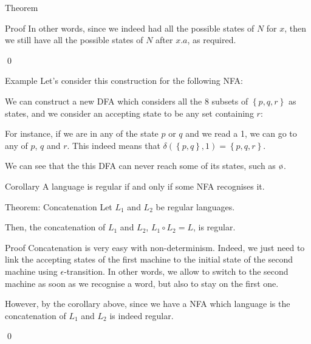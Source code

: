 \documentclass[a4paper]{article}
\begin{document}
\begin{parag}{Theorem}
\begin{subparag}{Proof}
        In other words, since we indeed had all the possible states of $N$ for $x$, then we still have all the possible states of $N$ after $x.a$, as required.

        \qed
    \end{subparag}
  
    \begin{subparag}{Example}
        Let's consider this construction for the following NFA:

        We can construct a new DFA which considers all the $8$ subsets of $\left\{p, q, r\right\}$ as states, and we consider an accepting state to be any set containing $r$:

        For instance, if we are in any of the state $p$ or $q$ and we read a 1, we can go to any of $p$, $q$ and $r$. This indeed means that $\delta\left(\left\{p, q\right\}, 1\right) = \left\{p, q, r\right\}$.

        We can see that the this DFA can never reach some of its states, such as $\o$.
    \end{subparag}
\end{parag}

\begin{parag}{Corollary}
    A language is regular if and only if some NFA recognises it.
\end{parag}


\begin{parag}{Theorem: Concatenation}
    Let $L_1$ and $L_2$ be regular languages.

    Then, the concatenation of $L_1$ and $L_2$, $L_1 \circ L_2 = L$, is regular.

    \begin{subparag}{Proof}
        Concatenation is very easy with non-determinism. Indeed, we just need to link the accepting states of the first machine to the initial state of the second machine using $\epsilon$-transition. In other words, we allow to switch to the second machine as soon as we recognise a word, but also to stay on the first one.

        However, by the corollary above, since we have a NFA which language is the concatenation of $L_1$ and $L_2$ is indeed regular.

        \qed
    \end{subparag}
\end{parag}
\end{document}
